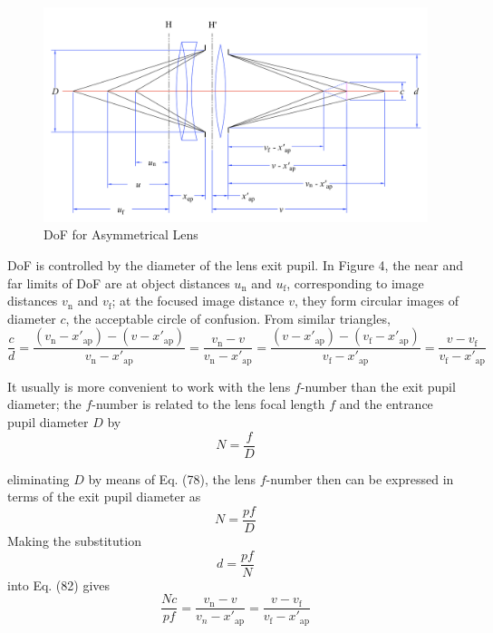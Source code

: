 \documentclass[11pt, oneside]{scrartcl}   	%
\begin{document}
\begin{figure}[htbp] %
   \centering
   \includegraphics[width=\linewidth]{figure/fig_dofd_4} 
   \caption{DoF for Asymmetrical Lens}
   \label{fig:DOFasymlens}
\end{figure}
DoF is controlled by the diameter of the lens exit pupil. In Figure 4, the near and far limits of DoF are at object distances $u_\mathrm{n}$ and $u_\mathrm{f}$, corresponding to image distances $v_\mathrm{n}$ and $v_\mathrm{f}$; at the focused image distance $v$, they form circular images of diameter $c$, the acceptable circle of confusion. From similar triangles,
\begin{equation}
\frac c d = \frac{(v_\mathrm{n}-x'_\mathrm{ap}) - (v-x'_\mathrm{ap})}{v_\mathrm{n}-x'_\mathrm{ap}} =
\frac {v_\mathrm{n} - v}{v_\mathrm{n}-x'_\mathrm{ap}} =
\frac{(v-x'_\mathrm{ap}) - (v_\mathrm{f}-x'_\mathrm{ap})}{v_\mathrm{f}-x'_\mathrm{ap}} =
\frac {v - v_\mathrm{f}}{v_\mathrm{f}-x'_\mathrm{ap}}
\label{eq:82}
\end{equation}


It usually is more convenient to work with the lens $f$-number than the exit pupil diameter;
the $f$-number is related to the lens focal length $f$ and the entrance pupil diameter $D$ by 
\begin{equation}
N = \frac f D
\end{equation}

eliminating $D$ by means of Eq. (78), the lens $f$-number then can be expressed in terms of the
exit pupil diameter as
\begin{equation}
N = \frac {pf} D
\end{equation}
Making the substitution
\begin{equation}
d = \frac {pf} N
\end{equation}
into Eq. (82) gives
\begin{equation}
   \frac {N\!c}{pf} = \frac{v_\mathrm{n} - v}{v_n - x'_\mathrm{ap}} = \frac {v - v_\mathrm{f}
}{v_\mathrm{f}- x'_\mathrm{ap}}
   \label{eq:83}
\end{equation}
\end{document}
